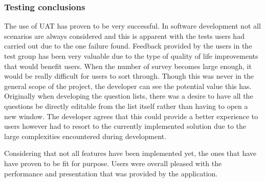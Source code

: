 \subsubsection*{Testing conclusions}
The use of UAT has proven to be very successful.
In software development not all scenarios are always considered and this is apparent with the tests users had carried out due to the one failure 
found.
Feedback provided by the users in the test group has been very valuable due to the type of quality of life improvements that would benefit users.
When the number of survey becomes large enough, it would be really difficult for users to sort through. 
Though this was never in the general scope of the project, the developer can see the potential value this has.
Originally when developing the question lists, there was a desire to have all the questions be directly editable from the list itself rather than
having to open a new window. 
The developer agrees that this could provide a better experience to users however had to resort to the currently implemented solution due to the 
large complexities encountered during development.

Considering that not all features have been implemented yet, the ones that have have proven to be fit for purpose.
Users were overall pleased with the performance and presentation that was provided by the application.